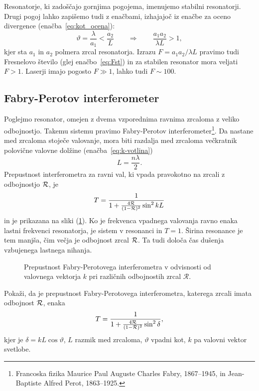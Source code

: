 Resonatorje, ki zadoščajo gornjima pogojema, imenujemo stabilni 
resonatorji.
Drugi pogoj lahko zapišemo tudi z enačbami, izhajajoč iz enačbe za oceno divergence (enačba~\ref{eq:kot_ocena}):
\begin{equation}
\vartheta = \frac{\lambda}{a_1} < \frac{a_2}{L} \qquad \Rightarrow \qquad
\frac{a_{1}a_{2}}{\lambda L}>1,
\label{eq:Fresnelovo_stevilo}
\end{equation}
kjer sta $a_{1}$ in $a_{2}$ polmera zrcal resonatorja. Izrazu 
$
F = a_{1}a_{2}/\lambda L
$
pravimo tudi Fresnelovo število (glej enačbo~\ref{eq:Fst})
in za stabilen resonator mora veljati $F>1$. Laserji imajo pogosto $F\gg 1$, lahko tudi $F \sim 100$.

\subsection*{Fabry-Perotov interferometer}
Poglejmo resonator, omejen z dvema vzporednima ravnima zrcaloma
z veliko odbojnostjo. Takemu sistemu pravimo Fabry-Perotov 
interferometer\footnote{Francoska fizika Maurice Paul Auguste Charles Fabry, 1867--1945, in 
Jean-Baptiste Alfred Perot, 1863--1925.}. 
Da nastane med zrcaloma stoječe valovanje, mora biti razdalja 
med zrcaloma večkratnik polovične valovne dolžine (enačba~\ref{eq:k-votlina})
\begin{equation}
L = \frac{n \lambda}{2}.
\end{equation}
Prepustnost interferometra za ravni val, ki vpada pravokotno na zrcali z
odbojnostjo ${\cal R}$, je 
\begin{equation}
T=\frac{1}{1+\frac{4{\cal R}}{(1-{\cal R})^{2}}\sin^{2}kL}
\label{eq:Fabry-Perot-prepustnost}
\end{equation}
in je prikazana na sliki (\ref{fig:Fabry-Perot}).
Ko je frekvenca vpadnega valovanja ravno enaka lastni frekvenci
resonatorja, je sistem v resonanci in  $T=1$. Širina resonance je tem manjša, čim
večja je odbojnost zrcal ${\cal R}$. Ta tudi določa čas dušenja vzbujenega
lastnega nihanja.
\begin{figure}[h!]
\centering
\def\svgwidth{95truemm} 

\caption{
Prepustnost Fabry-Perotovega interferometra
v odvisnosti od valovnega vektorja $k$ pri različnih odbojnostih zrcal
$\mathcal{R}.$}
\label{fig:Fabry-Perot}
\end{figure}

\begin{definition}
Pokaži, da je prepustnost Fabry-Perotovega interferometra, katerega zrcali imata odbojnost $\cal{R}$, enaka 
\begin{equation}
T = \frac{1}{1+\frac{4\cal{R}}{(1-{\cal R})^2}\sin^2 \delta},
\end{equation}
kjer je $\delta = kL\cos{\vartheta}$, $L$ razmik med zrcaloma, $\vartheta$ vpadni kot, 
$k$ pa valovni vektor svetlobe.
\end{definition}

